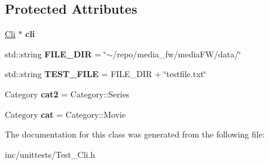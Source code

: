 \subsection*{Protected Attributes}
\begin{DoxyCompactItemize}
\item 
\mbox{\label{classCliTest_aa31b7626da78891c93a0c254d80acf17}} 
\hyperlink{classCli}{Cli} $\ast$ {\bfseries cli}
\item 
\mbox{\label{classCliTest_a8ed91232d6341370122edb04ac2941fe}} 
std\+::string {\bfseries F\+I\+L\+E\+\_\+\+D\+IR} = \char`\"{}$\sim$/repo/media\+\_\+fw/media\+FW/data/\char`\"{}
\item 
\mbox{\label{classCliTest_afa60a33336d73a6df66a0eb25329c0cc}} 
std\+::string {\bfseries T\+E\+S\+T\+\_\+\+F\+I\+LE} = F\+I\+L\+E\+\_\+\+D\+IR + \char`\"{}testfile.\+txt\char`\"{}
\item 
\mbox{\label{classCliTest_a8a8784d4c4ca008c283eafce7ef2c470}} 
Category {\bfseries cat2} = Category\+::\+Series
\item 
\mbox{\label{classCliTest_a40d64f87a28cb1a15712667e17430d5a}} 
Category {\bfseries cat} = Category\+::\+Movie
\end{DoxyCompactItemize}


The documentation for this class was generated from the following file\+:\begin{DoxyCompactItemize}
\item 
inc/unittests/Test\+\_\+\+Cli.\+h\end{DoxyCompactItemize}
